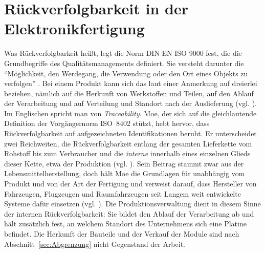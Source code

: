 \section{Rückverfolgbarkeit in der Elektronikfertigung}
\label{sec:Rueckverfolgbarkeit}
Was Rückverfolgbarkeit heißt, legt die Norm DIN EN ISO 9000 fest, die die
Grundbegriffe des Qualitätsmanagements definiert. Sie versteht darunter die
\enquote{Möglichkeit, den Werdegang, die Verwendung oder den Ort eines Objekts
zu verfolgen} \cite[S.~19]{DINENISO9000_2026}. Bei einem Produkt kann sich das
laut einer Anmerkung auf dreierlei beziehen, nämlich auf die Herkunft von
Werkstoffen und Teilen, auf den Ablauf der Verarbeitung und auf Verteilung und
Standort nach der Auslieferung (vgl. \cite[S.~19]{DINENISO9000_2026}). Im
Englischen spricht man von \emph{Traceability}. Moe, der sich auf die
gleichlautende Definition der Vorgängernorm ISO~8402 stützt, hebt hervor, dass
Rückverfolgbarkeit auf aufgezeichneten Identifikationen beruht. Er unterscheidet
zwei Reichweiten, die Rückverfolgbarkeit entlang der gesamten Lieferkette vom
Rohstoff bis zum Verbraucher und die \emph{interne} innerhalb eines einzelnen
Glieds dieser Kette, etwa der Produktion (vgl.
\cite[S.~211]{moePerspectivesTraceabilityFood1998}). Sein Beitrag stammt zwar
aus der Lebensmittelherstellung, doch hält Moe die Grundlagen für unabhängig vom
Produkt und von der Art der Fertigung und verweist darauf, dass Hersteller von
Fahrzeugen, Flugzeugen und Raumfahrzeugen seit Langem weit entwickelte Systeme
dafür einsetzen (vgl. \cite[S.~211]{moePerspectivesTraceabilityFood1998}). Die
Produktionsverwaltung dient in diesem Sinne der internen Rückverfolgbarkeit: Sie
bildet den Ablauf der Verarbeitung ab und hält zusätzlich fest, an welchem
Standort des Unternehmens sich eine Platine befindet. Die Herkunft der Bauteile
und der Verkauf der Module sind nach Abschnitt~\ref{sec:Abgrenzung} nicht
Gegenstand der Arbeit.

